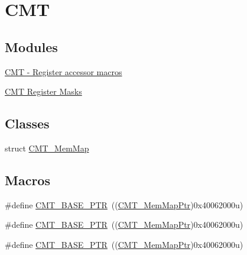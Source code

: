 \hypertarget{group___c_m_t___peripheral}{}\section{C\+MT}
\label{group___c_m_t___peripheral}
\subsection*{Modules}
\begin{DoxyCompactItemize}
\item 
\hyperlink{group___c_m_t___register___accessor___macros}{C\+M\+T -\/ Register accessor macros}
\item 
\hyperlink{group___c_m_t___register___masks}{C\+M\+T Register Masks}
\end{DoxyCompactItemize}
\subsection*{Classes}
\begin{DoxyCompactItemize}
\item 
struct \hyperlink{struct_c_m_t___mem_map}{C\+M\+T\+\_\+\+Mem\+Map}
\end{DoxyCompactItemize}
\subsection*{Macros}
\begin{DoxyCompactItemize}
\item 
\#define \hyperlink{group___c_m_t___peripheral_gae361f199741d5276c4618edb9ee289b7}{C\+M\+T\+\_\+\+B\+A\+S\+E\+\_\+\+P\+TR}~((\hyperlink{group___c_m_t___peripheral_ga9764155d28e775ee5d3200941c07f812}{C\+M\+T\+\_\+\+Mem\+Map\+Ptr})0x40062000u)
\item 
\#define \hyperlink{group___c_m_t___peripheral_gae361f199741d5276c4618edb9ee289b7}{C\+M\+T\+\_\+\+B\+A\+S\+E\+\_\+\+P\+TR}~((\hyperlink{group___c_m_t___peripheral_ga9764155d28e775ee5d3200941c07f812}{C\+M\+T\+\_\+\+Mem\+Map\+Ptr})0x40062000u)
\item 
\#define \hyperlink{group___c_m_t___peripheral_gae361f199741d5276c4618edb9ee289b7}{C\+M\+T\+\_\+\+B\+A\+S\+E\+\_\+\+P\+TR}~((\hyperlink{group___c_m_t___peripheral_ga9764155d28e775ee5d3200941c07f812}{C\+M\+T\+\_\+\+Mem\+Map\+Ptr})0x40062000u)
\end{DoxyCompactItemize}
